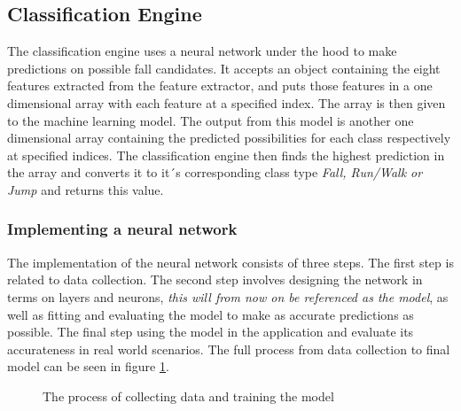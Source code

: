 \documentclass[12pt, a4paper, onecolumn]{article}
\begin{document}
	
	 \subsection{Classification Engine}
	 
	The classification engine uses a neural network under the hood to make predictions on possible fall candidates. It accepts an object containing the eight features extracted from the feature extractor, and puts those features in a one dimensional array with each feature at a specified index. The array is then given to the machine learning model. The output from this model is another one dimensional array containing the predicted possibilities for each class respectively at specified indices. The classification engine then finds the highest prediction in the array and converts it to it´s corresponding class type \textit{Fall, Run/Walk or Jump} and returns this value.
	 
	\subsubsection{Implementing a neural network}
	The implementation of the neural network consists of three steps. The first step is related to data collection. The second step involves designing the network in terms on layers and neurons, \textit{this will from now on be referenced as the model}, as well as fitting and evaluating the model to make as accurate predictions as possible. The final step using the model in the application and evaluate its accurateness in real world scenarios. The full process from data collection to final model can be seen in figure \ref{fig:training-model}.
	
	\begin{figure}[H]
		\centering
		\caption{The process of collecting data and training the model}%
		\label{fig:training-model}%
	\end{figure}
	
\end{document}
